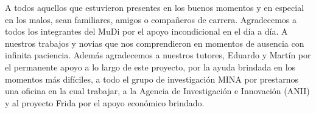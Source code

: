 
\begin{acknowledgements}      
A todos aquellos que estuvieron presentes en los buenos momentos y en especial en los malos, sean familiares, amigos o compa\~neros de carrera. Agradecemos a todos los integrantes del MuDi por el apoyo incondicional en el día a día. A nuestros trabajos y novias que nos comprendieron en momentos de ausencia con infinita paciencia. Adem\'as agradecemos a nuestros tutores, Eduardo y Martín por el permanente apoyo a lo largo de este proyecto, por la ayuda brindada en los momentos m\'as difíciles, a todo el grupo de investigaci\'on MINA por prestarnos una oficina en la cual trabajar, a la Agencia de Investigaci\'on e Innovaci\'on (ANII) y al proyecto Frida por el apoyo económico brindado.


\end{acknowledgements}
